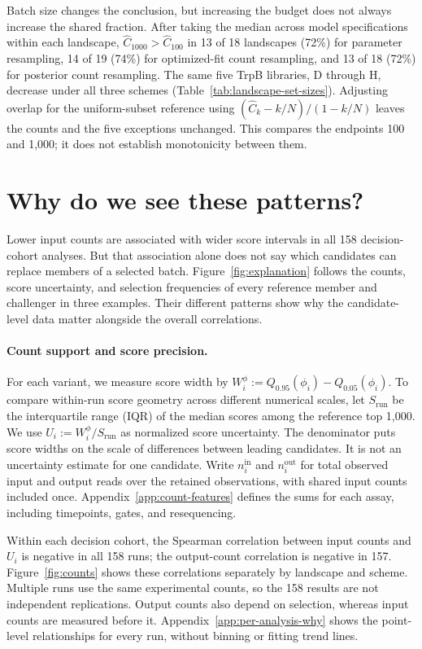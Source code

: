 \documentclass[11pt]{article}
\newcommand{\fit}{\phi}
\begin{document}
Batch size changes the conclusion, but increasing the budget does not always
increase the shared fraction.
After taking the median across model specifications within each landscape,
$\widehat C_{1000}>\widehat C_{100}$ in 13 of 18 landscapes (72\%) for
parameter resampling, 14 of 19 (74\%) for optimized-fit count resampling,
and 13 of 18 (72\%) for posterior count resampling. The same five TrpB
libraries, D through H, decrease under all three schemes
(Table~\ref{tab:landscape-set-sizes}). Adjusting overlap for the uniform-subset
reference using $(\widehat C_k-k/N)/(1-k/N)$ leaves the counts and the
five exceptions unchanged. This compares the endpoints 100 and 1,000;
it does not establish monotonicity between them.

\section{Why do we see these patterns?}
\label{sec:mechanisms}

Lower input counts are associated with wider score intervals in all 158
decision-cohort analyses. But that association alone does not say which
candidates can replace members of a selected batch. Figure~\ref{fig:explanation}
follows the counts, score uncertainty, and selection frequencies of every
reference member and challenger in three examples. Their different patterns
show why the candidate-level data matter alongside the overall correlations.

\paragraph{Count support and score precision.}
For each variant, we measure score width by
$W_i^{\fit}:=Q_{0.95}(\fit_i)-Q_{0.05}(\fit_i)$. To compare within-run
score geometry across different numerical scales, let $S_{\mathrm{run}}$
be the interquartile range (IQR) of the median scores among the reference top 1,000.
We use $U_i:=W_i^{\fit}/S_{\mathrm{run}}$ as normalized score uncertainty.
The denominator puts score widths on the scale of differences between
leading candidates. It is not an uncertainty estimate for one candidate.
Write $n_i^{\mathrm{in}}$ and $n_i^{\mathrm{out}}$ for total observed input
and output reads over the retained observations, with shared input counts
included once. Appendix~\ref{app:count-features} defines the sums for each
assay, including timepoints, gates, and resequencing.

Within each decision cohort, the Spearman correlation between input counts
and $U_i$ is negative in all 158 runs; the output-count correlation is
negative in 157. Figure~\ref{fig:counts} shows these correlations separately
by landscape and scheme. Multiple runs use the same experimental counts,
so the 158 results are not independent replications. Output counts also
depend on selection, whereas input counts are measured before it.
Appendix~\ref{app:per-analysis-why} shows the point-level relationships for
every run, without binning or fitting trend lines.
\end{document}
